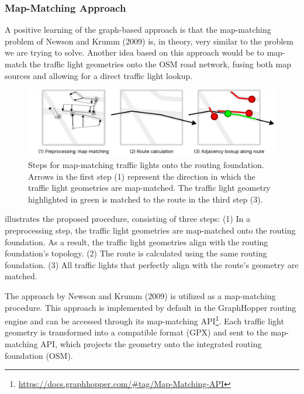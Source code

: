 \subsubsection{Map-Matching Approach}

A positive learning of the graph-based approach is that the map-matching problem of Newson and Krumm (2009) \cite{newson_hidden_2009} is, in theory, very similar to the problem we are trying to solve. Another idea based on this approach would be to map-match the traffic light geometries onto the OSM road network, fusing both map sources and allowing for a direct traffic light lookup.

\begin{figure}[t]
\centering
\includegraphics[width=\linewidth]{images/sg-selection-map-matching-approach.pdf}
\caption{Steps for map-matching traffic lights onto the routing foundation. Arrows in the first step (1) represent the direction in which the traffic light geometries are map-matched. The traffic light geometry highlighted in green is matched to the route in the third step (3).}
\label{fig:sg-selection-map-matching-approach}
\end{figure}

 illustrates the proposed procedure, consisting of three steps: (1) In a preprocessing step, the traffic light geometries are map-matched onto the routing foundation. As a result, the traffic light geometries align with the routing foundation's topology. (2) The route is calculated using the same routing foundation. (3) All traffic lights that perfectly align with the route's geometry are matched.

The approach by Newson and Krumm (2009) \cite{newson_hidden_2009} is utilized as a map-matching procedure. This approach is implemented by default in the GraphHopper routing engine and can be accessed through its map-matching API\footnote{\url{https://docs.graphhopper.com/\#tag/Map-Matching-API}}. Each traffic light geometry is transformed into a compatible format (GPX) and sent to the map-matching API, which projects the geometry onto the integrated routing foundation (OSM).

